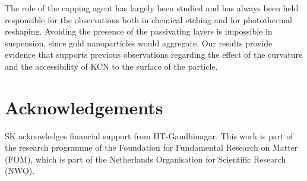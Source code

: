 The role of the capping agent has largely been studied and has always been
held responsible for the observations both in chemical etching\cite{Yuan2015}
and for photothermal reshaping\cite{Horiguchi2008}. Avoiding the presence of
the passivating layers is impossible in suspension, since gold nanoparticles
would aggregate. Our results provide evidence that supports previous
observations regarding the effect of the curvature and the accessibility of
KCN to the surface of the particle.

\section{Acknowledgements}
SK acknowledges financial support from IIT-Gandhinagar. This work is part of the
research programme of the Foundation for Fundamental Research on Matter (FOM),
which is part of the Netherlands Organisation for Scientific Research (NWO).

